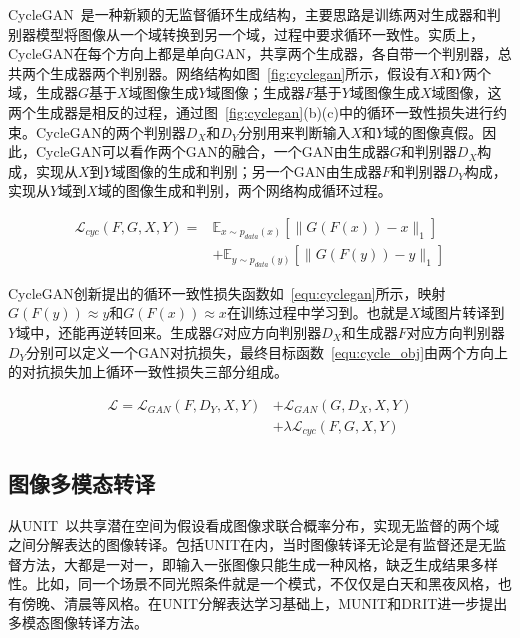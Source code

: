 CycleGAN~\cite{zhu2017unpaired}是一种新颖的无监督循环生成结构，主要思路是训练两对生成器和判别器模型将图像从一个域转换到另一个域，过程中要求循环一致性。实质上，CycleGAN在每个方向上都是单向GAN，共享两个生成器，各自带一个判别器，总共两个生成器两个判别器。网络结构如图~\ref{fig:cyclegan}所示，假设有$X$和$Y$两个域，生成器$G$基于$X$域图像生成$Y$域图像；生成器$F$基于$Y$域图像生成$X$域图像，这两个生成器是相反的过程，通过图~\ref{fig:cyclegan}(b)(c)中的循环一致性损失进行约束。CycleGAN的两个判别器$D_X$和$D_Y$分别用来判断输入$X$和$Y$域的图像真假。因此，CycleGAN可以看作两个GAN的融合，一个GAN由生成器$G$和判别器$D_X$构成，实现从$X$到$Y$域图像的生成和判别；另一个GAN由生成器$F$和判别器$D_Y$构成，实现从$Y$域到$X$域的图像生成和判别，两个网络构成循环过程。

\begin{equation}
\label{equ:cyclegan}
\begin{aligned}
\mathcal{L}_{cyc}(F,G,X,Y)= & \mathbb{E}_{x \sim p_{data}(x)}[\parallel G(F(x))-x \parallel_1]\\
& + \mathbb{E}_{y \sim p_{data}(y)}[\parallel G(F(y))-y \parallel_1]
\end{aligned}
\end{equation}

CycleGAN创新提出的循环一致性损失函数如~\ref{equ:cyclegan}所示，映射$ G(F(y)) \approx y$和$ G(F(x)) \approx x$在训练过程中学习到。也就是$X$域图片转译到$Y$域中，还能再逆转回来。生成器$G$对应方向判别器$D_X$和生成器$F$对应方向判别器$D_Y$分别可以定义一个GAN对抗损失，最终目标函数~\ref{equ:cycle_obj}由两个方向上的对抗损失加上循环一致性损失三部分组成。    

\begin{equation}
\label{equ:cycle_obj}
\begin{aligned}
\mathcal{L}=\mathcal{L}_{GAN}(F,D_Y,X,Y)&+\mathcal{L}_{GAN}(G,D_X,X,Y)\\
& + \lambda \mathcal{L}_{cyc}(F,G,X,Y)
\end{aligned}
\end{equation}


\subsection{图像多模态转译}
从UNIT~\cite{liu2017unsupervised}以共享潜在空间为假设看成图像求联合概率分布，实现无监督的两个域之间分解表达的图像转译。包括UNIT在内，当时图像转译无论是有监督还是无监督方法，大都是一对一，即输入一张图像只能生成一种风格，缺乏生成结果多样性。比如，同一个场景不同光照条件就是一个模式，不仅仅是白天和黑夜风格，也有傍晚、清晨等风格。在UNIT分解表达学习基础上，MUNIT和DRIT进一步提出多模态图像转译方法。

